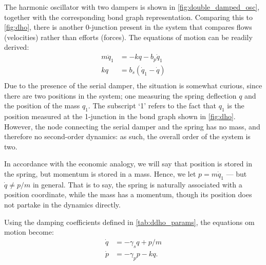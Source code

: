 The harmonic oscillator with two dampers is shown in \cref{fig:double_damped_osc}, together with the corresponding bond graph representation. Comparing this to \cref{fig:dho}, there is another 0-junction present in the system that compares flows (velocities) rather than efforts (forces). The equations of motion can be readily derived:
\begin{equation}
    \begin{split}
        m\ddot{q}_1 &= -kq - b_p \dot{q}_1 \\
        kq &= b_s(\dot{q}_1 - \dot{q}) \\
    \end{split}
    \label{eq:serial_eom_raw}
\end{equation}
Due to the presence of the serial damper, the situation is somewhat curious, since there are two positions in the system; one measuring the spring deflection $q$ and the position of the mass $q_1$. The subscript `1' refers to the fact that $q_1$ is the position measured at the 1-junction in the bond graph shown in \cref{fig:dho}. However, the node connecting the serial damper and the spring has no mass, and therefore no second-order dynamics: as such, the overall order of the system is two. 

In accordance with the economic analogy, we will say that position is stored in the spring, but momentum is stored in a mass.
Hence, we let $p = m\dot{q}_1$ --- but $\dot{q} \neq p/m$ in general. That is to say, the spring is naturally associated with a position coordinate, while the mass has a momentum, though its position does not partake in the dynamics directly.

Using the damping coefficients defined in \cref{tab:ddho_params}, the equations om motion become:
\begin{equation}
    \begin{split}
        \dot{q} &= -\gamma_s q + p/m  \\
        \dot{p} &= -\gamma_p p - kq.
    \end{split}
    \label{eq:serial_eom_pq}
\end{equation}


